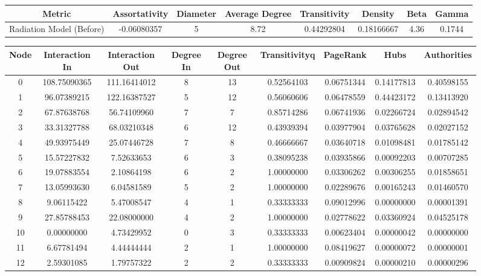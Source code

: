 \documentclass[12pt,a4paper]{thesis}
\begin{document}
\begin{figure}[H]
\centering
\tiny
\begin{tabular}{|c|c|c|c|c|c|c|c|}
\hline Metric & Assortativity & Diameter & Average Degree & Transitivity & Density & Beta & Gamma \\ 
\hline Radiation Model (Before) & -0.06080357 & 5 & 8.72 & 0.44292804 & 0.18166667 & 4.36 & 0.1744 \\ 
\hline 
\end{tabular} 
\end{figure}

\begin{figure}[H]
\centering
\tiny
\begin{tabular}{|c|c|c|c|c|c|c|c|c|}
\hline	Node	&	Interaction In	&	Interaction Out	&	Degree In	&	Degree Out	&	Transitivityq	&	PageRank	&	Hubs	&	Authorities	\\
\hline	0	&	108.75090365	&	111.16414012	&	8	&	13	&	0.52564103	&	0.06751344	&	0.14177813	&	0.40598155	\\
\hline	1	&	96.07389215	&	122.16387527	&	5	&	12	&	0.56060606	&	0.06478559	&	0.44423172	&	0.13413920	\\
\hline	2	&	67.87638768	&	56.74109960	&	7	&	7	&	0.85714286	&	0.06741936	&	0.02266724	&	0.02894542	\\
\hline	3	&	33.31327788	&	68.03210348	&	6	&	12	&	0.43939394	&	0.03977904	&	0.03765628	&	0.02027152	\\
\hline	4	&	49.93975449	&	25.07446728	&	7	&	8	&	0.46666667	&	0.03640718	&	0.01098481	&	0.01785142	\\
\hline	5	&	15.57227832	&	7.52633653	&	6	&	3	&	0.38095238	&	0.03935866	&	0.00092203	&	0.00707285	\\
\hline	6	&	19.07883554	&	2.10864198	&	6	&	2	&	1.00000000	&	0.03306262	&	0.00306255	&	0.01858651	\\
\hline	7	&	13.05993630	&	6.04581589	&	5	&	2	&	1.00000000	&	0.02289676	&	0.00165243	&	0.01460570	\\
\hline	8	&	9.06115422	&	5.47008547	&	4	&	1	&	0.33333333	&	0.09012996	&	0.00000000	&	0.00001391	\\
\hline	9	&	27.85788453	&	22.08000000	&	4	&	2	&	1.00000000	&	0.02778622	&	0.03360924	&	0.04525178	\\
\hline	10	&	0.00000000	&	4.73429952	&	0	&	3	&	0.33333333	&	0.00623404	&	0.00000042	&	0.00000000	\\
\hline	11	&	6.67781494	&	4.44444444	&	2	&	1	&	1.00000000	&	0.08419627	&	0.00000072	&	0.00000001	\\
\hline	12	&	2.59301085	&	1.79757322	&	2	&	2	&	0.33333333	&	0.00909824	&	0.00000210	&	0.00000296	\\

\end{tabular}
\end{figure}
\end{document}
